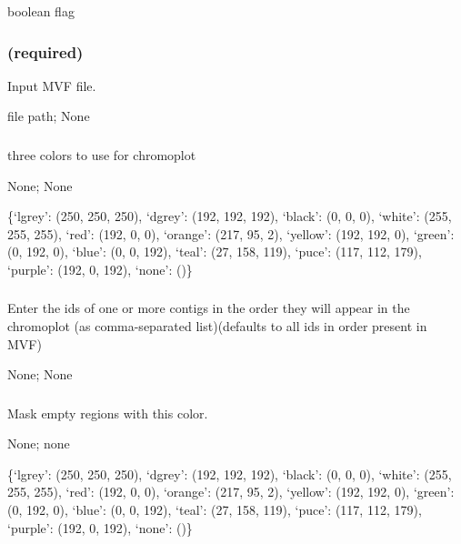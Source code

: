 \documentclass[letterpaper,11pt,english]{sphinxmanual}
\begin{document}
 boolean flag


\subsubsection{ (required)}
\label{\detokenize{prog_desc:id130}}
 Input MVF file.

 file path;  None


\subsubsection{}
\label{\detokenize{prog_desc:colors}}
 three colors to use for chromoplot

 None;  None

 \{‘lgrey’: (250, 250, 250), ‘dgrey’: (192, 192, 192), ‘black’: (0, 0, 0), ‘white’: (255, 255, 255), ‘red’: (192, 0, 0), ‘orange’: (217, 95, 2), ‘yellow’: (192, 192, 0), ‘green’: (0, 192, 0), ‘blue’: (0, 0, 192), ‘teal’: (27, 158, 119), ‘puce’: (117, 112, 179), ‘purple’: (192, 0, 192), ‘none’: ()\}


\subsubsection{}
\label{\detokenize{prog_desc:id131}}
 Enter the ids of one or more contigs in the order they will appear in the chromoplot (as comma-separated list)(defaults to all ids in order present in MVF)

 None;  None


\subsubsection{}
\label{\detokenize{prog_desc:empty-mask-emptymask}}
 Mask empty regions with this color.

 None;  none

 \{‘lgrey’: (250, 250, 250), ‘dgrey’: (192, 192, 192), ‘black’: (0, 0, 0), ‘white’: (255, 255, 255), ‘red’: (192, 0, 0), ‘orange’: (217, 95, 2), ‘yellow’: (192, 192, 0), ‘green’: (0, 192, 0), ‘blue’: (0, 0, 192), ‘teal’: (27, 158, 119), ‘puce’: (117, 112, 179), ‘purple’: (192, 0, 192), ‘none’: ()\}
\end{document}
